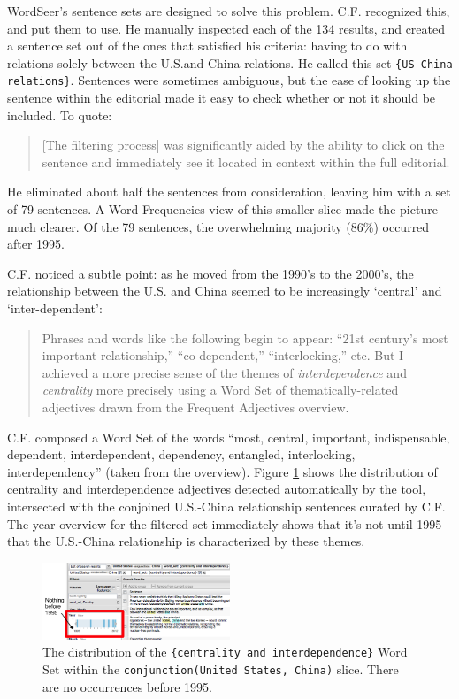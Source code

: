\documentclass{sig-alternate}
\newcommand{\code}[1] {\texttt{#1}}
\begin{document}
WordSeer's sentence sets are designed to solve this problem. C.F. recognized this, and put them to use. He manually inspected each of the 134 results, and created a sentence set out of the ones that satisfied his criteria: having to do with relations solely between the U.S.and China relations.  He called this set \code{\{US-China relations\}}. Sentences were sometimes ambiguous, but the ease of looking up the sentence within the editorial made it easy to check whether or not it should be included. To quote:
\begin{quote}
[The filtering process] was significantly aided by the ability to click on the sentence and immediately see it located in context within the full editorial.
\end{quote}
He eliminated about half the sentences from consideration, leaving him with a set of  79 sentences. A Word Frequencies view of this smaller slice made the picture much clearer. Of the 79 sentences, the overwhelming majority (86\%) occurred after 1995.

C.F. noticed a subtle point: as he moved from the 1990's to the 2000's, the relationship between the U.S. and China seemed to be increasingly  `central' and `inter-dependent':
\begin{quote}
Phrases and words like the following begin to appear: ``21st century's most important relationship,'' ``co-dependent,'' ``interlocking,'' etc. But I achieved a more precise sense of the themes of \emph{interdependence} and \emph{centrality } more precisely using a Word Set of thematically-related adjectives drawn from the Frequent Adjectives overview.
\end{quote}
C.F. composed a Word Set of the words ``most, central, important, indispensable, dependent, interdependent, dependency, entangled, interlocking, interdependency'' (taken from the overview). Figure \ref{fig:chris07} shows the distribution of centrality and interdependence adjectives detected automatically by the tool, intersected with the conjoined U.S.-China relationship sentences curated by C.F. The year-overview for the filtered set immediately shows that it's not until 1995 that the U.S.-China relationship is characterized by these themes.

\begin{figure}[h!]
\includegraphics[width=0.5\textwidth]{fig/chris/07.png}
\caption{ The distribution of the \code{\{centrality and interdependence\}} Word Set within the \code{conjunction(United States, China)} slice. There are no occurrences before 1995. \label{fig:chris07}}
\end{figure}
\end{document}
